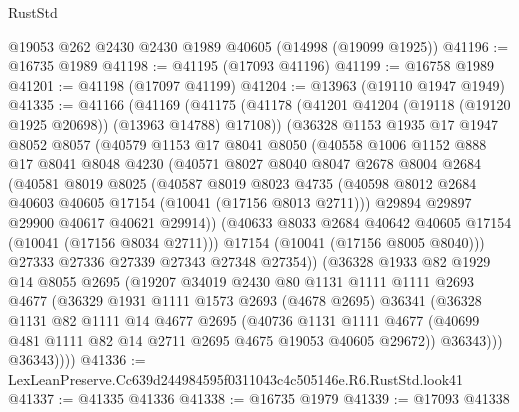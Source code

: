 \begin{lexlean}{RustStd}
\begin{coremodule}
    @19053
    @262
    @2430
    @2430
    @1989
    @40605
    (@14998 (@19099 @1925))
@41196 := @16735 @1989
@41198 := @41195 (@17093 @41196)
@41199 := @16758 @1989
@41201 := @41198 (@17097 @41199)
@41204 := @13963 (@19110 @1947 @1949)
@41335 := @41166
    (@41169
      (@41175
        (@41178 (@41201 @41204 (@19118 (@19120 @1925 @20698)) (@13963 @14788) @17108))
        (@36328
          @1153
          @1935
          @17
          @1947
          @8052
          @8057
          (@40579
            @1153
            @17
            @8041
            @8050
            (@40558
              @1006
              @1152
              @888
              @17
              @8041
              @8048
              @4230
              (@40571
                @8027
                @8040
                @8047
                @2678
                @8004
                @2684
                (@40581
                  @8019
                  @8025
                  (@40587
                    @8019
                    @8023
                    @4735
                    (@40598 @8012 @2684 @40603 @40605 @17154 (@10041 (@17156 @8013 @2711)))
                    @29894
                    @29897
                    @29900
                    @40617
                    @40621
                    @29914))
                (@40633 @8033 @2684 @40642 @40605 @17154 (@10041 (@17156 @8034 @2711)))
                @17154
                (@10041 (@17156 @8005 @8040)))
              @27333
              @27336
              @27339
              @27343
              @27348
              @27354))
          (@36328
            @1933
            @82
            @1929
            @14
            @8055
            @2695
            (@19207
              @34019
              @2430
              @80
              @1131
              @1111
              @1111
              @2693
              @4677
              (@36329
                @1931
                @1111
                @1573
                @2693
                (@4678 @2695)
                @36341
                (@36328
                  @1131
                  @82
                  @1111
                  @14
                  @4677
                  @2695
                  (@40736
                    @1131
                    @1111
                    @4677
                    (@40699 @481 @1111 @82 @14 @2711 @2695 @4675 @19053 @40605 @29672))
                  @36343)))
            @36343))))
@41336 := LexLeanPreserve.Cc639d244984595f0311043c4c505146e.R6.RustStd.look41
@41337 := @41335 @41336
@41338 := @16735 @1979
@41339 := @17093 @41338

\end{coremodule}
\end{lexlean}
